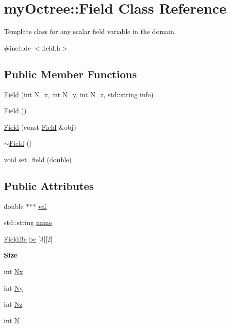 \hypertarget{classmy_octree_1_1_field}{}\section{my\+Octree\+:\+:Field Class Reference}
\label{classmy_octree_1_1_field}


Template class for any scalar field variable in the domain.  




{\ttfamily \#include $<$field.\+h$>$}

\subsection*{Public Member Functions}
\begin{DoxyCompactItemize}
\item 
\hyperlink{classmy_octree_1_1_field_afc0d406a0b1bfdf26e5e0bed885bd9a2}{Field} (int N\+\_\+x, int N\+\_\+y, int N\+\_\+z, std\+::string info)
\item 
\hyperlink{classmy_octree_1_1_field_a5fc00db76c0bb245ae13fc5af2e46df1}{Field} ()
\item 
\hyperlink{classmy_octree_1_1_field_a7e5b5f4c2712e755142483c3a5a55d6f}{Field} (const \hyperlink{classmy_octree_1_1_field}{Field} \&obj)
\item 
\hyperlink{classmy_octree_1_1_field_ac2dd7e18d625830473d80910b84b1ae7}{$\sim$\+Field} ()
\item 
void \hyperlink{classmy_octree_1_1_field_a671f7ea09f27dfdda6fa46d39c6be232}{set\+\_\+field} (double)
\end{DoxyCompactItemize}
\subsection*{Public Attributes}
\begin{DoxyCompactItemize}
\item 
double $\ast$$\ast$$\ast$ \hyperlink{classmy_octree_1_1_field_a500198aed026e6892c98b3db47c78348}{val}
\item 
std\+::string \hyperlink{classmy_octree_1_1_field_adab09d425664457ff438fbb21d2e8758}{name}
\item 
\hyperlink{namespacemy_octree_a1b5634e126358fc57232cfc9e6d96ad9}{Field\+Bc} \hyperlink{classmy_octree_1_1_field_a68d004c45354f2007a0dcae4a2a8f011}{bc} \mbox{[}3\mbox{]}\mbox{[}2\mbox{]}
\end{DoxyCompactItemize}
\begin{Indent}{\bf Size}\par
\begin{DoxyCompactItemize}
\item 
int \hyperlink{classmy_octree_1_1_field_ae7d086291559c6c6810752e27641e95b}{Nx}
\item 
int \hyperlink{classmy_octree_1_1_field_a0f1efff9530dcbe0783cacb8ba72e14c}{Ny}
\item 
int \hyperlink{classmy_octree_1_1_field_af7697d9e2864fc45a3a9b2b71cd26c7f}{Nz}
\item 
int \hyperlink{classmy_octree_1_1_field_af685307c6711d0d5602b92942af6ab2b}{N}
\end{DoxyCompactItemize}
\end{Indent}


